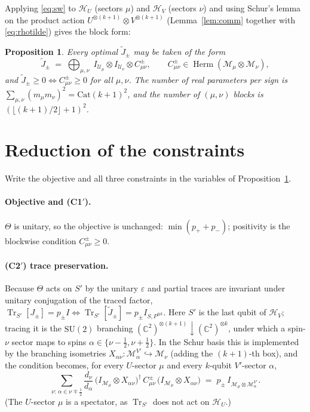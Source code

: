 \documentclass[11pt]{article}
\newtheorem{proposition}{Proposition}
\newcommand{\Tr}{\operatorname{Tr}}
\newcommand{\CC}{\mathbb{C}}
\newcommand{\HH}{\mathcal{H}}
\newcommand{\SU}{\mathrm{SU}}
\newcommand{\ox}{\otimes}
\newcommand{\dg}{\dagger}
\newcommand{\Hu}{\HH_U}
\newcommand{\Hv}{\HH_V}
\begin{document}
Applying \eqref{eq:sw} to $\Hu$ (sectors $\mu$) and $\Hv$ (sectors $\nu$) and using
Schur's lemma on the product action $U^{\ox(k+1)}\ox V^{\ox(k+1)}$ (Lemma~\ref{lem:comm}
together with \eqref{eq:rhotilde}) gives the block form:
\begin{proposition}\label{prop:block}
Every optimal $\widetilde J_\pm$ may be taken of the form
\begin{equation}\label{eq:block}
\widetilde J_\pm\;=\;\bigoplus_{\mu,\nu}\;
   I_{\mathcal{U}_\mu}\ox I_{\mathcal{U}_\nu}\ox C^{\pm}_{\mu\nu},
\qquad C^{\pm}_{\mu\nu}\in\operatorname{Herm}(\mathcal{M}_\mu\ox\mathcal{M}_\nu),
\end{equation}
and $\widetilde J_\pm\ge0\iff C^{\pm}_{\mu\nu}\ge0$ for all $\mu,\nu$. The number of real
parameters per sign is $\sum_{\mu,\nu}(m_\mu m_\nu)^2=\mathrm{Cat}(k+1)^2$, and the number
of $(\mu,\nu)$ blocks is $(\lfloor(k+1)/2\rfloor+1)^2$.
\end{proposition}

\section{Reduction of the constraints}
Write the objective and all three constraints in the variables of
Proposition~\ref{prop:block}.

\paragraph{Objective and (C1$'$).} $\Theta$ is unitary, so the objective is unchanged:
$\min(p_++p_-)$; positivity is the blockwise condition $C^{\pm}_{\mu\nu}\ge0$.

\paragraph{(C2$'$) trace preservation.} Because $\Theta$ acts on $S'$ by the unitary
$\varepsilon$ and partial traces are invariant under unitary conjugation of the traced
factor, $\Tr_{S'}[J_\pm]=p_\pm I\iff\Tr_{S'}[\widetilde J_\pm]=p_\pm I_{S,P^{\ox k}}$. Here
$S'$ is the last qubit of $\Hv$; tracing it is the $\SU(2)$ branching
$(\CC^2)^{\ox(k+1)}\!\downarrow\!(\CC^2)^{\ox k}$, under which a spin-$\nu$ sector maps to
spins $\alpha\in\{\nu-\tfrac12,\nu+\tfrac12\}$. In the Schur basis this is implemented by
the branching isometries $X_{\alpha\nu}:\mathcal{M}^{V'}_\alpha\hookrightarrow\mathcal{M}_\nu$
(adding the $(k+1)$-th box), and the condition becomes, for every $U$-sector $\mu$ and every
$k$-qubit $V'$-sector $\alpha$,
\begin{equation}\label{eq:C2red}
\sum_{\nu:\,\alpha\in\nu\mp\frac12}\frac{d_\nu}{d_\alpha}\,
   \big(I_{\mathcal{M}_\mu}\ox X_{\alpha\nu}\big)^\dg\,C^{\pm}_{\mu\nu}\,
   \big(I_{\mathcal{M}_\mu}\ox X_{\alpha\nu}\big)
\;=\;p_\pm\,I_{\mathcal{M}_\mu\ox\mathcal{M}^{V'}_\alpha}.
\end{equation}
(The $U$-sector $\mu$ is a spectator, as $\Tr_{S'}$ does not act on $\Hu$.)
\end{document}
